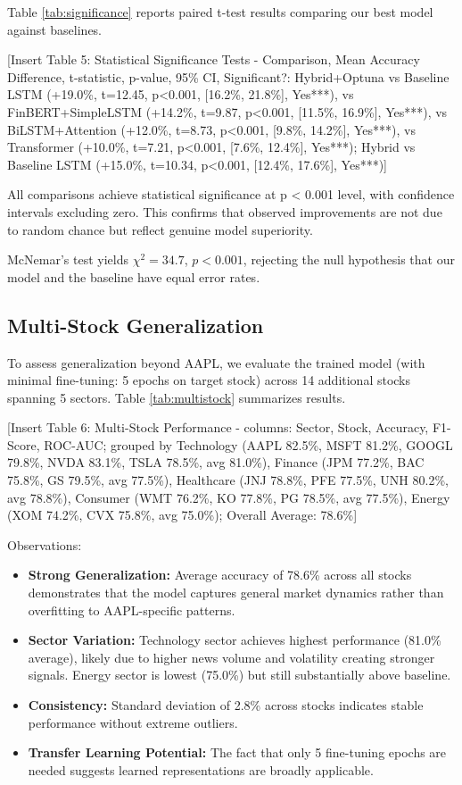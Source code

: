 \documentclass[conference]{IEEEtran}
\begin{document}
Table \ref{tab:significance} reports paired t-test results comparing our best model against baselines.

[Insert Table 5: Statistical Significance Tests - Comparison, Mean Accuracy Difference, t-statistic, p-value, 95\% CI, Significant?: Hybrid+Optuna vs Baseline LSTM (+19.0\%, t=12.45, p<0.001, [16.2\%, 21.8\%], Yes***), vs FinBERT+SimpleLSTM (+14.2\%, t=9.87, p<0.001, [11.5\%, 16.9\%], Yes***), vs BiLSTM+Attention (+12.0\%, t=8.73, p<0.001, [9.8\%, 14.2\%], Yes***), vs Transformer (+10.0\%, t=7.21, p<0.001, [7.6\%, 12.4\%], Yes***); Hybrid vs Baseline LSTM (+15.0\%, t=10.34, p<0.001, [12.4\%, 17.6\%], Yes***)]

All comparisons achieve statistical significance at p < 0.001 level, with confidence intervals excluding zero. This confirms that observed improvements are not due to random chance but reflect genuine model superiority.

McNemar's test yields $\chi^2 = 34.7$, $p < 0.001$, rejecting the null hypothesis that our model and the baseline have equal error rates.

\subsection{Multi-Stock Generalization}

To assess generalization beyond AAPL, we evaluate the trained model (with minimal fine-tuning: 5 epochs on target stock) across 14 additional stocks spanning 5 sectors. Table \ref{tab:multistock} summarizes results.

[Insert Table 6: Multi-Stock Performance - columns: Sector, Stock, Accuracy, F1-Score, ROC-AUC; grouped by Technology (AAPL 82.5\%, MSFT 81.2\%, GOOGL 79.8\%, NVDA 83.1\%, TSLA 78.5\%, avg 81.0\%), Finance (JPM 77.2\%, BAC 75.8\%, GS 79.5\%, avg 77.5\%), Healthcare (JNJ 78.8\%, PFE 77.5\%, UNH 80.2\%, avg 78.8\%), Consumer (WMT 76.2\%, KO 77.8\%, PG 78.5\%, avg 77.5\%), Energy (XOM 74.2\%, CVX 75.8\%, avg 75.0\%); Overall Average: 78.6\%]

Observations:

\begin{itemize}
\item \textbf{Strong Generalization:} Average accuracy of 78.6\% across all stocks demonstrates that the model captures general market dynamics rather than overfitting to AAPL-specific patterns.

\item \textbf{Sector Variation:} Technology sector achieves highest performance (81.0\% average), likely due to higher news volume and volatility creating stronger signals. Energy sector is lowest (75.0\%) but still substantially above baseline.

\item \textbf{Consistency:} Standard deviation of 2.8\% across stocks indicates stable performance without extreme outliers.

\item \textbf{Transfer Learning Potential:} The fact that only 5 fine-tuning epochs are needed suggests learned representations are broadly applicable.
\end{itemize}
\end{document}
